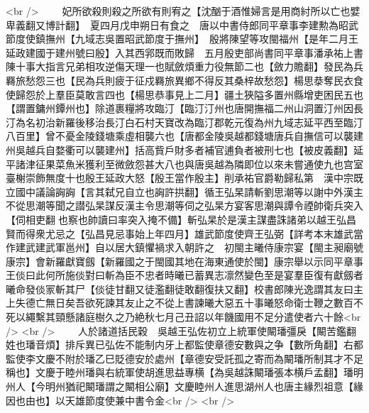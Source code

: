 <br />
　　妃所欲殺則殺之所欲有則宥之【沈酗于酒惟婦言是用商紂所以亡也嬖卑義翻又博計翻】　夏四月戊申朔日有食之　唐以中書侍郎同平章事李建勲為昭武節度使鎮撫州【九域志吳置昭武節度于撫州】　殷將陳望等攻閩福州【是年二月王延政建國于建州號曰殷】入其西郛既而敗歸　五月殷吏部尚書同平章事潘承祐上書陳十事大指言兄弟相攻逆傷天理一也賦斂煩重力役無節二也【斂力贍翻】發民為兵羇旅愁怨三也【民為兵則疲于征戍羇旅異鄉不得反其桑梓故愁怨】楊思㳟奪民衣食使歸怨於上羣臣莫敢言四也【楊思恭事見上二月】疆土狹隘多置州縣增吏困民五也【謂置鏞州鐔州也】除道裹糧將攻臨汀【臨汀汀州也唐開撫福二州山洞置汀州因長汀為名初治新羅後移治長汀白石村天寶改為臨汀郡乾元復為州九域志延平西至臨汀八百里】曾不憂金陵錢塘乘虛相襲六也【唐都金陵吳越都錢塘唐兵自撫信可以襲建州吳越兵自婺衢可以襲建州】括高貲戶財多者補官逋負者被刑七也【被皮義翻】延平諸津征果菜魚米獲利至微斂怨甚大八也與唐吳越為隣即位以來未嘗通使九也宫室臺榭崇飾無度十也殷王延政大怒【殷王當作殷主】削承祐官爵勒歸私第　漢中宗既立國中議論詾詾【言其弑兄自立也詾許拱翻】循王弘杲請斬劉思潮等以謝中外漢主不從思潮等聞之譛弘杲謀反漢主令思潮等伺之弘杲方宴客思潮與譚令禋帥衛兵突入【伺相吏翻也察也帥讀曰率突入掩不備】斬弘杲於是漢主謀盡誅諸弟以越王弘昌賢而得衆尤忌之【弘昌見忌事始上年四月】雄武節度使齊王弘弼【詳考本末雄武當作建武建武軍邕州】自以居大鎮懼禍求入朝許之　初閩主曦侍康宗宴【閩主昶廟號康宗】會新羅獻寶劔【新羅國之于閩國其地在海東通使於閩】康宗舉以示同平章事王倓曰此何所施倓對曰斬為臣不忠者時曦已蓄異志凛然變色至是宴羣臣復有獻劔者曦命發倓冡斬其尸【倓徒甘翻又徒濫翻徒敢翻復扶又翻】校書郎陳光逸謂其友曰主上失德亡無日矣吾欲死諫其友止之不從上書諫曦大惡五十事曦怒命衛士鞭之數百不死以繩繫其頸懸諸庭樹久之乃絶秋七月己丑詔以年饑國用不足分遣使者六十餘<br />
<br />
　　人於諸道括民穀　吳越王弘佐初立上統軍使闞璠彊戾【闞苦鑑翻姓也璠音煩】排斥異已弘佐不能制内牙上都監使章德安數與之争【數所角翻】右都監使李文慶不附於璠乙巳貶德安於處州【章德安受託孤之寄而為闞璠所制其才不足稱也】文慶于睦州璠與右統軍使胡進思益專横【為吳越誅闞璠張本横戶孟翻】璠明州人【今明州猶祀闞璠謂之闞相公廟】文慶睦州人進思湖州人也唐主緣烈祖意【緣因也由也】以天雄節度使兼中書令金<br />
<br />
